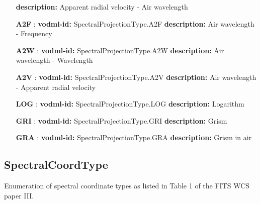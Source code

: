 \begin{itemize}
          \textbf{description:} Apparent radial velocity - Air wavelength
    \item[\textbf{A2F}]: \textbf{vodml-id:} SpectralProjectionType.A2F \newline
          \textbf{description:} Air wavelength - Frequency
    \item[\textbf{A2W}]: \textbf{vodml-id:} SpectralProjectionType.A2W \newline
          \textbf{description:} Air wavelength - Wavelength
    \item[\textbf{A2V}]: \textbf{vodml-id:} SpectralProjectionType.A2V \newline
          \textbf{description:} Air wavelength - Apparent radial velocity
    \item[\textbf{LOG}]: \textbf{vodml-id:} SpectralProjectionType.LOG \newline
          \textbf{description:} Logarithm
    \item[\textbf{GRI}]: \textbf{vodml-id:} SpectralProjectionType.GRI \newline
          \textbf{description:} Grism
    \item[\textbf{GRA}]: \textbf{vodml-id:} SpectralProjectionType.GRA \newline
          \textbf{description:} Grism in air
  \end{itemize}
  \normalsize

  \subsection{SpectralCoordType}
  \label{sect:SpectralCoordType}

  Enumeration of spectral coordinate types as listed in Table 1 of the FITS WCS paper III.

